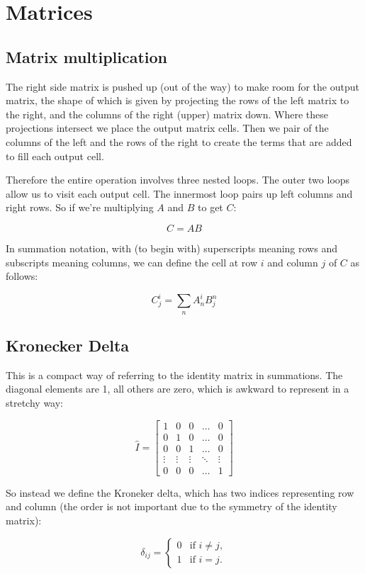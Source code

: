 \chapter{Matrices}

\section{Matrix multiplication}

The right side matrix is pushed up (out of the way) to make room for the output matrix, the shape of which is given by projecting the rows of the left matrix to the right, and the columns of the right (upper) matrix down. Where these projections intersect we place the output matrix cells. Then we pair of the columns of the left and the rows of the right to create the terms that are added to fill each output cell.

Therefore the entire operation involves three nested loops. The outer two loops allow us to visit each output cell. The innermost loop pairs up left columns and right rows. So if we're multiplying $A$ and $B$ to get $C$:

$$C = AB$$

In summation notation, with (to begin with) superscripts meaning rows and subscripts meaning columns, we can define the cell at row $i$ and column $j$ of $C$ as follows:

$$C^i_j = \sum_n{A^i_nB^n_j}$$

\section{Kronecker Delta}

This is a compact way of referring to the identity matrix in summations. The diagonal elements are 1, all others are zero, which is awkward to represent in a stretchy way:

$$
\hat{I} = \begin{bmatrix}
1 & 0 & 0 & \dots & 0 \\
0 & 1 & 0 & \dots & 0 \\
0 & 0 & 1 & \dots & 0 \\
\vdots & \vdots & \vdots & \ddots & \vdots\\
0 & 0 & 0 & \dots & 1
\end{bmatrix}
$$

So instead we define the Kroneker delta, which has two indices representing row and column (the order is not important due to the symmetry of the identity matrix):

$$
\delta_{ij} = \begin{cases}
0 &\text{if } i \neq j,   \\
1 &\text{if } i=j.   \end{cases}
$$
